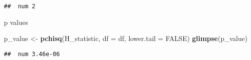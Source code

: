 \documentclass[
]{article}
\newenvironment{Shaded}{\begin{snugshade}}{\end{snugshade}}
\newcommand{\AttributeTok}[1]{\textcolor[rgb]{0.13,0.29,0.53}{#1}}
\newcommand{\ConstantTok}[1]{\textcolor[rgb]{0.56,0.35,0.01}{#1}}
\newcommand{\DecValTok}[1]{\textcolor[rgb]{0.00,0.00,0.81}{#1}}
\newcommand{\FunctionTok}[1]{\textcolor[rgb]{0.13,0.29,0.53}{\textbf{#1}}}
\newcommand{\NormalTok}[1]{#1}
\newcommand{\OtherTok}[1]{\textcolor[rgb]{0.56,0.35,0.01}{#1}}
\newcommand{\SpecialCharTok}[1]{\textcolor[rgb]{0.81,0.36,0.00}{\textbf{#1}}}
\begin{document}
\begin{Shaded}
\end{Shaded}

\begin{verbatim}
##  num 2
\end{verbatim}

p values

\begin{Shaded}
\begin{Highlighting}[]
\NormalTok{p\_value }\OtherTok{\textless{}{-}} \FunctionTok{pchisq}\NormalTok{(H\_statistic, }\AttributeTok{df =}\NormalTok{ df, }\AttributeTok{lower.tail =} \ConstantTok{FALSE}\NormalTok{)}
\FunctionTok{glimpse}\NormalTok{(p\_value)}
\end{Highlighting}
\end{Shaded}

\begin{verbatim}
##  num 3.46e-06
\end{verbatim}
\end{document}
